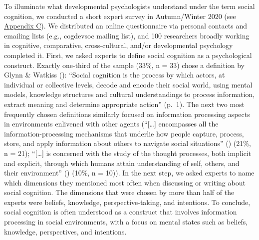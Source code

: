\documentclass[
]{scrbook}
\begin{document}
To illuminate what developmental psychologists understand under the term social cognition, we conducted a short expert survey in Autumn/Winter 2020 (see \hyperref[appendixC]{Appendix C}). We distributed an online questionnaire via personal contacts and emailing lists (e.g., cogdevsoc mailing list), and 100 researchers broadly working in cognitive, comparative, cross-cultural, and/or developmental psychology completed it. First, we asked experts to define social cognition as a psychological construct. Exactly one-third of the sample (33\%, n = 33) chose a definition by Glynn \& Watkiss (): ``Social cognition is the process by which actors, at individual or collective levels, decode and encode their social world, using mental models, knowledge structures and cultural understandings to process information, extract meaning and determine appropriate action'' (p.~1). The next two most frequently chosen definitions similarly focused on information processing aspects in environments enlivened with other agents (``{[}\ldots{]} encompasses all the information-processing mechanisms that underlie how people capture, process, store, and apply information about others to navigate social situations'' () (21\%, n = 21); ``{[}\ldots{]} is concerned with the study of the thought processes, both implicit and explicit, through which humans attain understanding of self, others, and their environment'' () (10\%, n = 10)). In the next step, we asked experts to name which dimensions they mentioned most often when discussing or writing about social cognition. The dimensions that were chosen by more than half of the experts were beliefs, knowledge, perspective-taking, and intentions. To conclude, social cognition is often understood as a construct that involves information processing in social environments, with a focus on mental states such as beliefs, knowledge, perspectives, and intentions.
\end{document}
